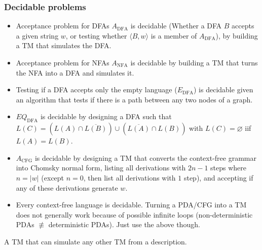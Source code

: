 \documentclass[9pt, twocolumn]{extarticle}
\newcommand{\definition}[2]{%
  \begin{definitionbox}{\titlecap{#1}}
    #2
  \end{definitionbox}
}
\begin{document}
\subsubsection{Decidable problems}
\begin{itemize}
  \item Acceptance problem for DFAs $A_{\text{DFA}}$ is decidable (Whether a DFA $B$ accepts a given string $w$, or testing whether $\langle B,w\rangle$ is a member of $A_\text{DFA}$), by building a TM that simulates the DFA.
  \item Acceptance problem for NFAs $A_\text{NFA}$ is decidable by building a TM that turns the NFA into a DFA and simulates it.
  \item Testing if a DFA accepts only the empty language ($E_\text{DFA}$) is decidable given an algorithm that tests if there is a path between any two nodes of a graph.
  \item $EQ_\text{DFA}$ is decidable by designing a DFA such that $L(C)=(L(A)\cap\overline{L(B)})\cup(\overline{L(A)}\cap L(B))$ with $L(C)=\varnothing$ iif $L(A)=L(B)$.
  \item $A_\text{CFG}$ is decidable by designing a TM that converts the context-free grammar into Chomsky normal form, listing all derivations with $2n-1$ steps where $n=|w|$ (except $n=0$, then list all derivations with $1$ step), and accepting if any of these derivations generate $w$.
  \item Every context-free language is decidable. Turning a PDA/CFG into a TM does not generally work because of possible infinite loops (non-deterministic PDAs $\not\equiv$ deterministic PDAs). Just use the above though.
\end{itemize}

\definition{Universal Turing Machine}{A TM that can simulate any other TM from a description.}
\end{document}

